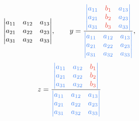 \begin{multicols}{2}
{\begin{equation*}
{{                            \begin{vmatrix}
                                a_{11} & a_{12} & a_{13} \\
                                a_{21} & a_{22} & a_{23} \\
                                a_{31} & a_{32} & a_{33}
                            \end{vmatrix}
                        }
                    }
                    ,\qquad
                y
                    = \frac{
                        \xmemphB{
                            \begin{vmatrix}
                                a_{11} & \xmemphR{b_1} & a_{13} \\
                                a_{21} & \xmemphR{b_2} & a_{23} \\
                                a_{31} & \xmemphR{b_3} & a_{33}
                            \end{vmatrix}
                        }
                    }{
                        \xmemphB{
                            \begin{vmatrix}
                                a_{11} & a_{12} & a_{13} \\
                                a_{21} & a_{22} & a_{23} \\
                                a_{31} & a_{32} & a_{33}
                            \end{vmatrix}
                        }
                    }
                    ,
        \end{equation*}
        \begin{equation*}
                z
                    = \frac{
                        \xmemphB{
                            \begin{vmatrix}
                                a_{11} & a_{12} & \xmemphR{b_1} \\
                                a_{21} & a_{22} & \xmemphR{b_2} \\
                                a_{31} & a_{32} & \xmemphR{b_3}
                            \end{vmatrix}
                        }
                    }{
                        \xmemphB{
                            \begin{vmatrix}
                                a_{11} & a_{12} & a_{13} \\
                                a_{21} & a_{22} & a_{23} \\
                                a_{31} & a_{32} & a_{33}
                            \end{vmatrix}
                        }
                    }
        \end{equation*}

    }

\end{multicols}

